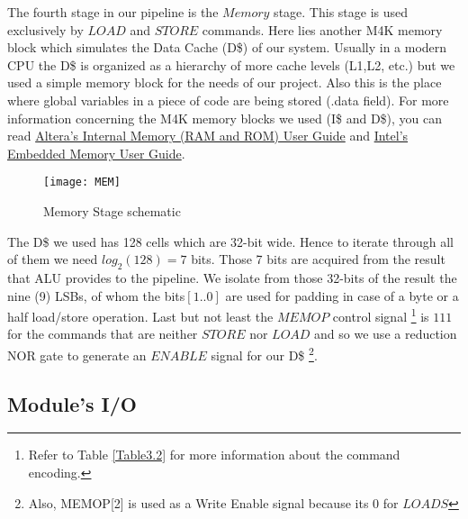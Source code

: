   The fourth stage in our pipeline is the $Memory$ stage. This stage is used exclusively by $LOAD$ and $STORE$ commands. Here lies another M4K memory block which simulates the Data Cache (D\$) of our system. 
  Usually in a modern CPU the D\$ is organized as a hierarchy of more cache levels (L1,L2, etc.) but we used a simple memory block for the needs of our project. Also this is the place where global variables in a piece of code are being stored (.data field). For more information concerning the M4K memory blocks we used (I\$ and D\$), you can read \href{https://www.intel.com/content/dam/www/programmable/us/en/pdfs/literature/an/an207.pdf}{Altera's Internal Memory (RAM and ROM) User Guide} and \href{https://www.intel.com/content/dam/www/programmable/us/en/pdfs/literature/ug/ug_ram_rom.pdf}{Intel's Embedded Memory User Guide}.
  
  \begin{figure}[h!]
  	\begin{center}
  		\texttt{[image: MEM]}
  		\caption{Memory Stage schematic}
  		\label{Image3.11}
  	\end{center}
  \end{figure}

  \vspace{-5mm}

  The D\$ we used has 128 cells which are 32-bit wide. Hence to iterate through all of them we need $log_{2}(128) = 7$ bits. Those 7 bits are acquired from the result that ALU provides to the pipeline. We isolate from those 32-bits of the result the nine (9) LSBs, of whom the bits$[1..0]$ are used for padding in case of a byte or a half load/store operation. Last but not least the $MEMOP$ control signal \footnote{ Refer to Table \ref{Table3.2} for more information about the command encoding.} is $111$ for the commands that are neither $STORE$ nor $LOAD$ and so we use a reduction NOR gate to generate an $ENABLE$ signal for our D\$ \footnote{Also, MEMOP[2] is used as a Write Enable signal because its 0 for $LOADS$}.
  
  \vspace{-3mm}
  
  \subsection{Module's I/O}
  \label{SubSec3.4.1:I/O}
  
